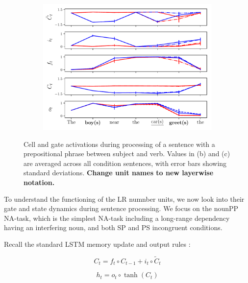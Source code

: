 \begin{figure}[ht]
\begin{subfigure}{0.32\textwidth}
    \label{fig:singular-unit}
    \end{subfigure}
    \begin{subfigure}{0.32\textwidth}
            \centering
            \includegraphics[width=\linewidth]{Figures/nounpp_775.pdf}
    \label{fig:plural-unit}
    \end{subfigure}
\caption{Cell and gate activations during processing of a sentence with a prepositional phrase between subject and verb. Values in (b) and (c) are averaged across all condition sentences, with error bars showing standard deviations. \textbf{Change unit names to new layerwise notation.}}
\end{figure}

To understand the functioning of the LR numnber units, we now look
into their gate and state dynamics during sentence processing. We
focus on the nounPP NA-task, which is the simplest NA-task including a
long-range dependency having an interfering noun, and both SP and PS
incongruent conditions.

Recall the standard LSTM memory update and output rules \cite{Hochreiter:Schmidhuber:1997}:

\begin{equation} \label{eq:update-rule}
     C_t = f_t\circ C_{t-1} + i_t\circ \widetilde{C}_t
\end{equation}

\begin{equation} \label{eq:output}
     h_t = o_t\circ \tanh(C_t)
\end{equation}

